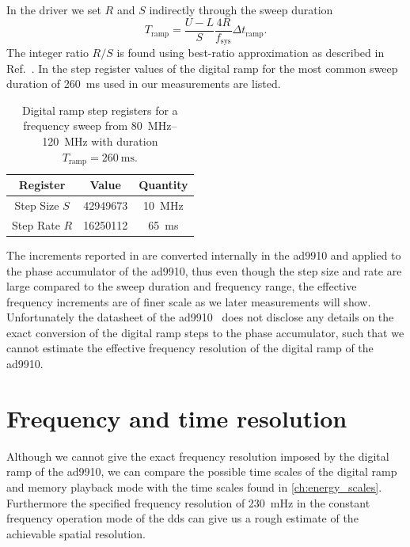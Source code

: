 In the driver we set $R$ and $S$ indirectly through the sweep duration
\begin{equation}
  T_\text{ramp}
  =
  \frac{U-L}{S}\frac{4R}{f_\text{sys}}
  \Delta t_\text{ramp}
  \label{eq:dds_dramp_duration}.
\end{equation}
The integer ratio $R/S$ is found using best-ratio approximation as described
in Ref.~\cite{Ashley2003}. In  the step register
values of the digital ramp for the most common sweep duration of
\SI{260}{\milli\second} used in our measurements are listed.
\begin{table}[htb]
  \centering
  \begin{tabular}{ccc}
    \toprule
    Register & Value & Quantity \\
    \midrule
    Step Size $S$ & \num{42949673} & \SI{10}{\mega\hertz} \\
    Step Rate $R$ & \num{16250112} & \SI{65}{\milli\second} \\
    \bottomrule
  \end{tabular}
  \caption{Digital ramp step registers for a frequency sweep from
    \SIrange{80}{120}{\mega\hertz} with duration
    $T_\text{ramp}=\SI{260}{\milli\second}$.
  }\label{tab:dds_dramp_steps}
\end{table}
The increments reported in  are converted
internally in the \gls{ad9910} and applied to the phase accumulator of the
\gls{ad9910}, thus even though the step size and rate are large compared to
the sweep duration and frequency range, the effective frequency increments
are of finer scale as we later measurements will show. Unfortunately the
datasheet of the \gls{ad9910}~\cite{AD9910} does not disclose any details on
the exact conversion of the digital ramp steps to the phase accumulator,
such that we cannot estimate the effective frequency resolution of the digital
ramp of the \gls{ad9910}.

\section{Frequency and time resolution}

Although we cannot give the exact frequency resolution imposed by the digital
ramp of the \gls{ad9910}, we can compare the possible time scales of the
digital ramp and memory playback mode with the time scales found in
\cref{ch:energy_scales}. Furthermore the specified frequency resolution
of \SI{230}{\milli\hertz} in the constant frequency operation mode of the
\gls{dds} can give us a rough estimate of the achievable spatial resolution.

